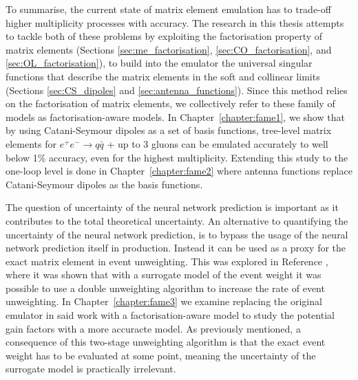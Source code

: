 \documentclass[main.tex]{subfiles}
\begin{document}
    To summarise, the current state of matrix element
    emulation has to trade-off higher multiplicity processes
    with accuracy. The research in this thesis attempts to
    tackle both of these problems by exploiting the factorisation
    property of matrix elements (Sections \ref{sec:me_factorisation},
    \ref{sec:CO_factorisation}, and \ref{sec:OL_factorisation}),
    to build into the emulator the universal singular functions
    that describe the matrix elements in the soft and collinear limits
    (Sections \ref{sec:CS_dipoles} and \ref{sec:antenna_functions}).
    Since this method relies on the factorisation of matrix
    elements, we collectively refer to these family of models
    as factorisation-aware models.
    In Chapter~\ref{chapter:fame1}, we show that by using
    Catani-Seymour dipoles as a set of basis functions, tree-level
    matrix elements for $e^{+}e^{-} \rightarrow q \bar{q}$ + up to 3 gluons
    can be emulated accurately to well below 1\% accuracy,
    even for the highest multiplicity. Extending this study
    to the one-loop level is done in Chapter~\ref{chapter:fame2}
    where antenna functions replace Catani-Seymour dipoles as
    the basis functions.

    The question of uncertainty of the neural network
    prediction is important as it contributes to the total
    theoretical uncertainty. An alternative to quantifying
    the uncertainty of the neural network prediction, is to
    bypass the usage of the neural network prediction itself
    in production.
    Instead it can be used as a proxy for the exact matrix
    element in event unweighting. This was explored in
    Reference \cite{Danziger:2021eeg},
    where it was shown that with a surrogate model of the event
    weight it was possible to use a double unweighting
    algorithm to increase the rate of event unweighting.
    In Chapter~\ref{chapter:fame3} we examine replacing
    the original emulator in said work with a factorisation-aware
    model to study the potential gain factors with a more
    accuracte model. As previously mentioned, a consequence of
    this two-stage unweighting
    algorithm is that the exact event weight has to be evaluated
    at some point, meaning the uncertainty of the surrogate
    model is practically irrelevant.
\end{document}
